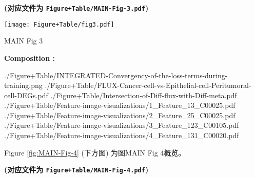 \documentclass[
]{article}
\begin{document}
\textbf{(对应文件为 \texttt{Figure+Table/MAIN-Fig-3.pdf})}

\def\@captype{figure}
\begin{center}
\texttt{[image: Figure+Table/fig3.pdf]}
\caption{MAIN Fig 3}\label{fig:MAIN-Fig-3}
\end{center}
\begin{center}\begin{tcolorbox}[colback=gray!10, colframe=gray!50, width=0.9\linewidth, arc=1mm, boxrule=0.5pt]
\textbf{
Composition
:}

\vspace{0.5em}

    ./Figure+Table/INTEGRATED-Convergency-of-the-loss-terms-during-training.png
\newline
./Figure+Table/FLUX-Cancer-cell-vs-Epithelial-cell-Peritumoral-cell-DEGs.pdf
\newline
./Figure+Table/Intersection-of-Diff-flux-with-Diff-meta.pdf
\newline
./Figure+Table/Feature-image-visualizations/1\_Feature\_13\_C00025.pdf
\newline
./Figure+Table/Feature-image-visualizations/2\_Feature\_25\_C00025.pdf
\newline
./Figure+Table/Feature-image-visualizations/3\_Feature\_123\_C00105.pdf
\newline
./Figure+Table/Feature-image-visualizations/4\_Feature\_131\_C00020.pdf

\vspace{2em}
\end{tcolorbox}
\end{center}

\begin{center}\vspace{1.5cm}\end{center}

\begin{center}\vspace{1.5cm}\end{center}

Figure \ref{fig:MAIN-Fig-4} (下方图) 为图MAIN Fig 4概览。

\textbf{(对应文件为 \texttt{Figure+Table/MAIN-Fig-4.pdf})}
\end{document}
